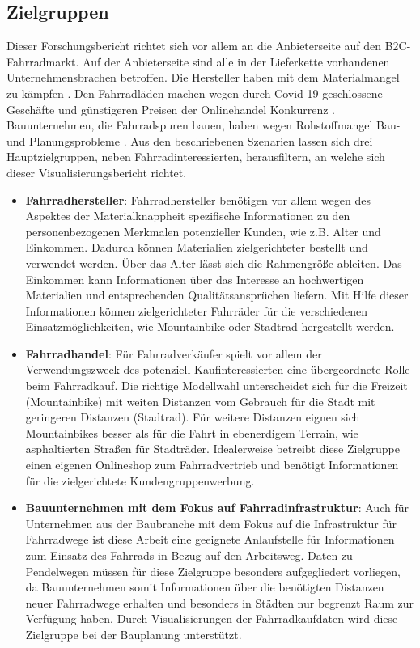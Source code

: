 \documentclass[usegeometry=true]{scrartcl}
\begin{document}
\subsection{Zielgruppen}
Dieser Forschungsbericht richtet sich vor allem an die Anbieterseite auf den B2C-Fahrradmarkt. Auf der Anbieterseite sind alle in der Lieferkette vorhandenen Unternehmensbrachen betroffen. Die Hersteller haben mit dem Materialmangel zu kämpfen \cite{tagesschau.11.03.2021}. Den Fahrradläden machen wegen durch Covid-19 geschlossene Geschäfte und günstigeren Preisen der Onlinehandel Konkurrenz \cite{VeloTOTALDasgroteNetzwerkrundumdasThemaFahrrad.2021,Follmer.03.09.2021}. Bauunternehmen, die Fahrradspuren bauen, haben wegen Rohstoffmangel  Bau- und Planungsprobleme \cite{Knitterscheidt.14.06.2021}. Aus den beschriebenen Szenarien lassen sich drei Hauptzielgruppen, neben Fahrradinteressierten, herausfiltern, an welche sich dieser Visualisierungsbericht richtet.
\begin{itemize}
 \item \textbf{Fahrradhersteller}: 
 \newline Fahrradhersteller benötigen vor allem wegen des Aspektes der Materialknappheit spezifische Informationen zu den personenbezogenen Merkmalen potenzieller Kunden, wie z.B.  Alter und Einkommen. Dadurch können Materialien zielgerichteter bestellt und verwendet werden. Über das Alter lässt sich die Rahmengröße ableiten. Das Einkommen kann Informationen über das Interesse an hochwertigen Materialien und entsprechenden Qualitätsansprüchen liefern. Mit Hilfe dieser Informationen können zielgerichteter Fahrräder für die verschiedenen Einsatzmöglichkeiten, wie Mountainbike oder Stadtrad hergestellt werden. 
 \item \textbf{Fahrradhandel}:
 \newline Für Fahrradverkäufer spielt vor allem der Verwendungszweck des potenziell Kaufinteressierten eine übergeordnete Rolle beim Fahrradkauf. Die richtige Modellwahl unterscheidet sich für die Freizeit (Mountainbike) mit weiten Distanzen vom Gebrauch für die Stadt mit geringeren Distanzen (Stadtrad). Für weitere Distanzen eignen sich Mountainbikes besser als für die Fahrt in ebenerdigem Terrain, wie asphaltierten Straßen für Stadträder. Idealerweise betreibt diese Zielgruppe einen eigenen Onlineshop zum Fahrradvertrieb und benötigt Informationen für die zielgerichtete Kundengruppenwerbung. 

 \item \textbf{Bauunternehmen mit dem Fokus auf Fahrradinfrastruktur}:
 \newline Auch für Unternehmen aus der Baubranche mit dem Fokus auf die Infrastruktur für Fahrradwege ist diese Arbeit eine geeignete Anlaufstelle für Informationen zum Einsatz des Fahrrads in Bezug auf den Arbeitsweg. Daten zu Pendelwegen müssen für diese Zielgruppe besonders aufgegliedert vorliegen, da Bauunternehmen somit Informationen über die benötigten Distanzen neuer Fahrradwege erhalten und besonders in Städten nur begrenzt Raum zur Verfügung haben. Durch Visualisierungen der Fahrradkaufdaten wird diese Zielgruppe bei der Bauplanung unterstützt.
 
\end{itemize}
\end{document}
